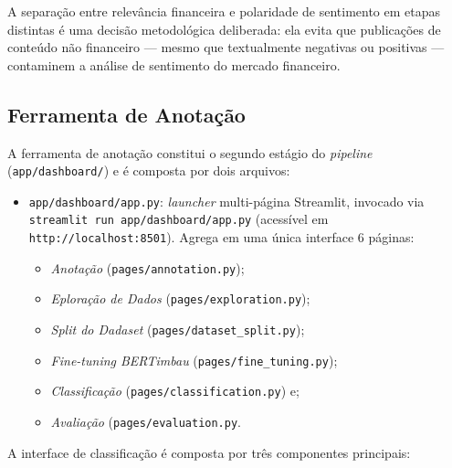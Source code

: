 A separação entre relevância financeira e polaridade de sentimento em etapas distintas é uma decisão metodológica deliberada: ela evita que publicações de conteúdo não financeiro --- mesmo que textualmente negativas ou positivas --- contaminem a análise de sentimento do mercado financeiro.

\subsection{Ferramenta de Anotação}
\label{subsec:ferramenta_anotacao}

A ferramenta de anotação constitui o segundo estágio do \textit{pipeline} (\texttt{app/dashboard/}) e é composta por dois arquivos:

\begin{itemize}
	\item \texttt{app/dashboard/app.py}: \textit{launcher} multi-página Streamlit, invocado via \texttt{streamlit run app/dashboard/app.py} (acessível em \texttt{http://localhost:8501}). Agrega em uma única interface 6 páginas:
	
	\begin{itemize}
		\item \textit{Anotação} (\texttt{pages/annotation.py});
		\item \textit{Eploração de Dados} (\texttt{pages/exploration.py});
		\item \textit{Split do Dadaset} (\texttt{pages/dataset\_split.py});
		\item \textit{Fine-tuning BERTimbau} (\texttt{pages/fine\_tuning.py});
		\item \textit{Classificação} (\texttt{pages/classification.py}) e;
		\item \textit{Avaliação} (\texttt{pages/evaluation.py}.
	\end{itemize}

\end{itemize}

A interface de classificação é composta por três componentes principais:

